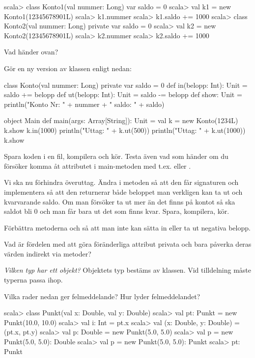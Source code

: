 \begin{REPL}
scala> class Konto1(val nummer: Long){ var saldo = 0 }
scala> val k1 = new Konto1(12345678901L)
scala> k1.nummer
scala> k1.saldo += 1000
scala> class Konto2(val nummer: Long){ private var saldo = 0 }
scala> val k2 = new Konto2(12345678901L)
scala> k2.nummer
scala> k2.saldo += 1000
\end{REPL}

\Subtask Vad händer ovan?

\Subtask Gör en ny version av klassen  enligt nedan:

\begin{Code}
class Konto(val nummer: Long){ 
  private var saldo = 0
  def in(belopp: Int): Unit = {saldo += belopp}
  def ut(belopp: Int): Unit = {saldo -= belopp}
  def show: Unit = 
    println("Konto Nr: " + nummer + " saldo: " + saldo) 
}

object Main {
  def main(args: Array[String]): Unit = {
    val k = new Konto(1234L)
    k.show
    k.in(1000)
    println("Uttag: " + k.ut(500))
    println("Uttag: " + k.ut(1000))
    k.show
  }
}
\end{Code}

\Subtask Spara koden i en fil, kompilera och kör. Testa även vad som händer om du försöker komma åt attributet  i main-metoden med t.ex.  eller . 

\Subtask Vi ska nu förhindra överuttag. Ändra i metoden  så att den får signaturen  och implementera  så att den returnerar både beloppet man verkligen kan ta ut och kvarvarande saldo. Om man försöker ta ut mer än det finns på kontot så ska saldot bli 0 och man får bara ut det som finns kvar. Spara, kompilera, kör. 

\Subtask Förbättra metoderna  och  så att man inte kan sätta in eller ta ut negativa belopp.

\Subtask Vad är fördelen med att göra föränderliga attribut privata och bara påverka deras värden indirekt via metoder?

\Task \emph{Vilken typ har ett objekt?} Objektets typ bestäms av klassen. Vid tilldelning måste typerna passa ihop.

\Subtask Vilka rader nedan ger felmeddelande? Hur lyder felmeddelandet?
\begin{REPL}
scala> class Punkt(val x: Double, val y: Double)
scala> val pt: Punkt = new Punkt(10.0, 10.0)
scala> val i: Int = pt.x
scala> val (x: Double, y: Double) = (pt.x, pt.y)
scala> val p: Double = new Punkt(5.0, 5.0)
scala> val p = new Punkt(5.0, 5.0): Double
scala> val p = new Punkt(5.0, 5.0): Punkt
scala> pt: Punkt
\end{REPL}


